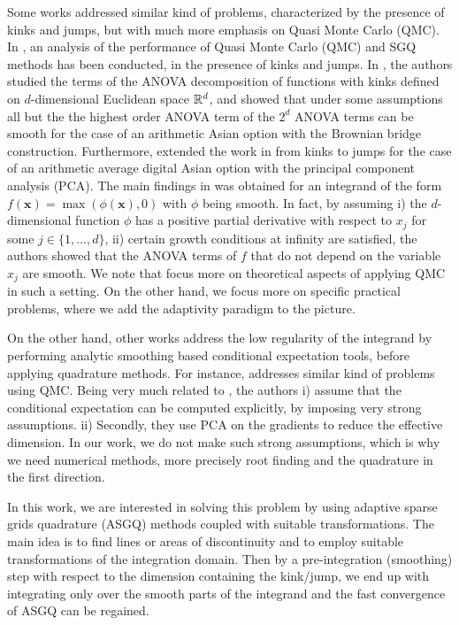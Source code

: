 \begin{enumerate}
Some works \cite{griebel2013smoothing,bayersmoothing, griebel2017note,griewank2017high,xiao2018conditional} addressed similar kind of problems, characterized by the presence of kinks and jumps,  but with much more emphasis on Quasi Monte Carlo (QMC). In \cite{griebel2013smoothing, griebel2017note,griewank2017high}, an  analysis of the performance of  Quasi Monte Carlo (QMC) and SGQ methods has been conducted, in the presence of kinks and jumps.  In \cite{griebel2013smoothing,griebel2017note}, the authors studied the terms of the ANOVA decomposition of functions with kinks defined on $d$-dimensional Euclidean space $\mathbb{R}^d$, and showed   that under some assumptions all but the the highest order ANOVA term  of the $2^d$ ANOVA terms can be smooth for the case of an arithmetic Asian option with the Brownian bridge construction. Furthermore, \cite{griewank2017high} extended the work in \cite{griebel2013smoothing,griebel2017note} from kinks
to jumps for  the case of an arithmetic average digital Asian option with the principal component analysis (PCA). The main findings in \cite{griebel2013smoothing,griebel2017note} was obtained  for an  integrand  of the form $f(\mathbf{x}) = \max(\phi(\mathbf{x}), 0)$ with $\phi$ being smooth. In fact, by assuming  i) the $d$-dimensional function $\phi$ has a positive partial derivative with respect to $x_j$ for some $j \in \{1,\dots,d\}$, ii) certain growth conditions at infinity are satisfied, the authors showed that the ANOVA terms of $f$ that do not depend on the variable $x_j$ are smooth.   We note that \cite{griebel2013smoothing,griebel2017note,griewank2017high} focus  more on  theoretical aspects of applying QMC in such a setting. On the other hand, we focus more on  specific practical problems, where we add the adaptivity paradigm to the picture.

On the other hand, other works \cite{bayersmoothing,xiao2018conditional,bayer2018hierarchical} address the low regularity of the integrand by performing analytic smoothing based conditional expectation tools, before applying quadrature methods. For instance,    \cite{xiao2018conditional} addresses similar kind of problems using QMC. Being very much related to \cite{bayersmoothing}, the authors i) assume that the conditional expectation can be computed explicitly, by imposing very strong assumptions. ii) Secondly, they  use  PCA on the gradients to reduce the effective dimension. In our work, we do not make such strong assumptions, which is why we need numerical methods, more precisely root finding and the quadrature in the first direction.

In this work, we are interested in solving this problem  by using adaptive  sparse grids quadrature (ASGQ) methods coupled with suitable transformations. The main idea is to find lines or areas of discontinuity and to employ suitable transformations of the integration domain. Then  by a pre-integration (smoothing) step with respect to the dimension containing the kink/jump,  we end up with integrating  only over the smooth parts of the integrand and the fast convergence of ASGQ can be regained.
\end{enumerate}



